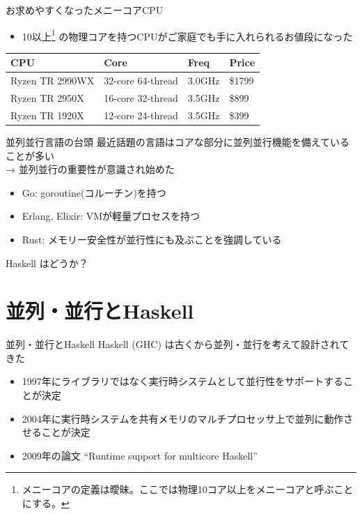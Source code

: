 \documentclass[unicode,12pt]{beamer}
\begin{document}
\begin{frame}{お求めやすくなったメニーコアCPU}
  \begin{itemize}
  \item 10以上\footnote{メニーコアの定義は曖昧。ここでは物理10コア以上をメニーコアと呼ぶことにする。}
    の物理コアを持つCPUがご家庭でも手に入れられるお値段になった
    \end{itemize}
  \begin{tabular}{llll} \hline
    CPU & Core & Freq & Price \\ \hline
    Ryzen TR 2990WX & 32-core 64-thread & 3.0GHz & \$1799 \\
    Ryzen TR 2950X & 16-core 32-thread & 3.5GHz & \$899 \\
    Ryzen TR 1920X & 12-core 24-thread & 3.5GHz & \$399 \\
    \hline
  \end{tabular}
\end{frame}

\begin{frame}{並列並行言語の台頭}
  最近話題の言語はコアな部分に並列並行機能を備えていることが多い \\
  → 並列並行の重要性が意識され始めた
  \begin{itemize}
  \item Go: goroutine(コルーチン)を持つ
  \item Erlang, Elixir: VMが軽量プロセスを持つ
  \item Rust: メモリー安全性が並行性にも及ぶことを強調している
  \end{itemize}
  Haskell はどうか？
\end{frame}

\section{並列・並行とHaskell}

\begin{frame}{並列・並行とHaskell}
  Haskell (GHC) は古くから並列・並行を考えて設計されてきた
  \begin{itemize}
  \item 1997年にライブラリではなく実行時システムとして並行性をサポートすることが決定
  \item 2004年に実行時システムを共有メモリのマルチプロセッサ上で並列に動作させることが決定
  \item 2009年の論文 ``Runtime support for multicore Haskell''
  \end{itemize}
\end{frame}
\end{document}
